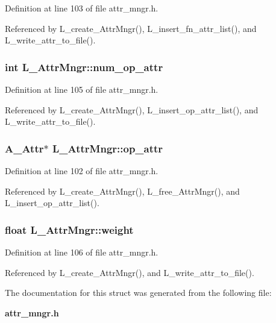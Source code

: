 Definition at line 103 of file attr\_\-mngr.h.

Referenced by L\_\-create\_\-Attr\-Mngr(), L\_\-insert\_\-fn\_\-attr\_\-list(), and L\_\-write\_\-attr\_\-to\_\-file().
\subsubsection{\setlength{\rightskip}{0pt plus 5cm}int \bf{L\_\-Attr\-Mngr::num\_\-op\_\-attr}}\label{structL__AttrMngr_ee8febf5f621cc952bf2d01d908856ef}




Definition at line 105 of file attr\_\-mngr.h.

Referenced by L\_\-create\_\-Attr\-Mngr(), L\_\-insert\_\-op\_\-attr\_\-list(), and L\_\-write\_\-attr\_\-to\_\-file().
\subsubsection{\setlength{\rightskip}{0pt plus 5cm}\bf{A\_\-Attr}$\ast$ \bf{L\_\-Attr\-Mngr::op\_\-attr}}\label{structL__AttrMngr_52a4a7fc31008562f17119cdf1be65b0}




Definition at line 102 of file attr\_\-mngr.h.

Referenced by L\_\-create\_\-Attr\-Mngr(), L\_\-free\_\-Attr\-Mngr(), and L\_\-insert\_\-op\_\-attr\_\-list().
\subsubsection{\setlength{\rightskip}{0pt plus 5cm}float \bf{L\_\-Attr\-Mngr::weight}}\label{structL__AttrMngr_6d0cdfaf1b41a028a02acf8a32070b78}




Definition at line 106 of file attr\_\-mngr.h.

Referenced by L\_\-create\_\-Attr\-Mngr(), and L\_\-write\_\-attr\_\-to\_\-file().

The documentation for this struct was generated from the following file:\begin{CompactItemize}
\item 
\bf{attr\_\-mngr.h}\end{CompactItemize}
